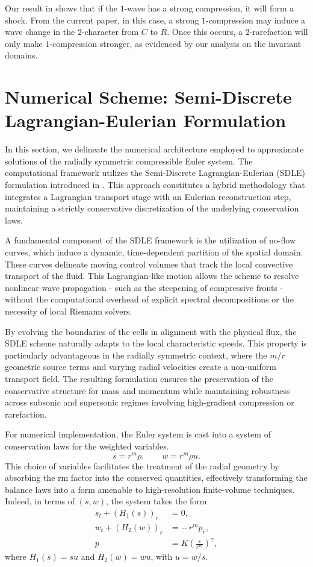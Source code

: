 \documentclass[11pt]{article}
\begin{document}
Our result in \cite{F2} shows that if the $1$-wave has a strong compression, it will form a shock. From the current paper, in this case, a strong $1$-compression may induce a wave change in the $2$-character from $C$ to $R$. Once this occurs, a $2$-rarefaction will only make $1$-compression stronger, as evidenced by our analysis on the invariant domains. 

\section{Numerical Scheme: Semi-Discrete Lagrangian-Eulerian Formulation}\label{sec:scheme}

In this section, we delineate the numerical architecture employed to approximate solutions of the radially symmetric compressible Euler system. The computational framework utilizes the Semi-Discrete Lagrangian-Eulerian (SDLE) formulation introduced in \cite{ABREU_LE_LINEAR}. This approach constitutes a hybrid methodology that integrates a Lagrangian transport stage with an Eulerian reconstruction step, maintaining a strictly conservative discretization of the underlying conservation laws.

A fundamental component of the SDLE framework is the utilization of no-flow curves, which induce a dynamic, time-dependent partition of the spatial domain. These curves delineate moving control volumes that track the local convective transport of the fluid. This Lagrangian-like motion allows the scheme to resolve nonlinear wave propagation - such as the steepening of compressive fronts - without the computational overhead of explicit spectral decompositions or the necessity of local Riemann solvers.

By evolving the boundaries of the cells in alignment with the physical flux, the SDLE scheme naturally adapts to the local characteristic speeds. This property is particularly advantageous in the radially symmetric context, where the $m/r$ geometric source terms and varying radial velocities create a non-uniform transport field. The resulting formulation ensures the preservation of the conservative structure for mass and momentum while maintaining robustness across subsonic and supersonic regimes involving high-gradient compression or rarefaction.

For numerical implementation, the Euler system is cast into a system of conservation 
laws for the weighted variables. 
\[
s = r^{m}\rho,
\qquad
w = r^{m}\rho u.
\]
This choice of variables facilitates the treatment of the radial geometry by absorbing the rm factor into the conserved quantities, effectively transforming the balance laws into a form amenable to high-resolution finite-volume techniques. Indeed, in terms of $(s,w)$, the system takes the form
\begin{align}
    s_{t} + (H_{1}(s))_{r} & = 0, \label{eq:sdle_s}\\
    w_{t} + (H_{2}(w))_{r} & = -\,r^{m}p_{r}, \label{eq:sdle_w}\\
    p & = K\left(\frac{s}{r^{m}}\right)^{\gamma}, \label{eq:sdle_p}
\end{align}
where $H_{1}(s)=su$ and $H_{2}(w)=wu$, with $u=w/s$.
\end{document}

